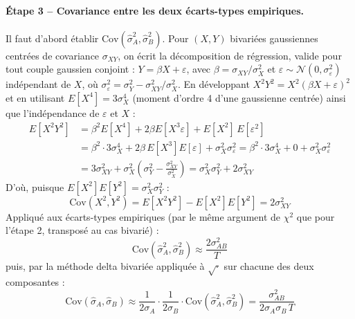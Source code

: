 \documentclass{article}
\begin{document}
\paragraph{Étape 3 -- Covariance entre les deux écarts-types empiriques.} Il faut d'abord établir $\text{Cov}(\hat\sigma_A^2,\hat\sigma_B^2)$. Pour $(X,Y)$ bivariées gaussiennes centrées de covariance $\sigma_{XY}$, on écrit la décomposition de régression, valide pour tout couple gaussien conjoint : $Y=\beta X+\varepsilon$, avec $\beta=\sigma_{XY}/\sigma_X^2$ et $\varepsilon\sim\mathcal{N}(0,\sigma_\varepsilon^2)$ indépendant de $X$, où $\sigma_\varepsilon^2=\sigma_Y^2-\sigma_{XY}^2/\sigma_X^2$. En développant $X^2Y^2=X^2(\beta X+\varepsilon)^2$ et en utilisant $E[X^4]=3\sigma_X^4$ (moment d'ordre 4 d'une gaussienne centrée) ainsi que l'indépendance de $\varepsilon$ et $X$ :
\begin{align}
E[X^2Y^2] &= \beta^2 E[X^4] + 2\beta E[X^3\varepsilon] + E[X^2]\,E[\varepsilon^2] \\
&= \beta^2\cdot 3\sigma_X^4 + 2\beta\,E[X^3]E[\varepsilon] + \sigma_X^2\sigma_\varepsilon^2 = \beta^2\cdot 3\sigma_X^4 + 0 + \sigma_X^2\sigma_\varepsilon^2\\
&= 3\sigma_{XY}^2 + \sigma_X^2\left(\sigma_Y^2-\frac{\sigma_{XY}^2}{\sigma_X^2}\right) = \sigma_X^2\sigma_Y^2 + 2\sigma_{XY}^2
\end{align}
D'où, puisque $E[X^2]E[Y^2]=\sigma_X^2\sigma_Y^2$ :
\begin{equation}
\text{Cov}(X^2,Y^2) = E[X^2Y^2]-E[X^2]E[Y^2] = 2\sigma_{XY}^2
\end{equation}
Appliqué aux écarts-types empiriques (par le même argument de $\chi^2$ que pour l'étape 2, transposé au cas bivarié) :
\begin{equation}
\text{Cov}(\hat\sigma_A^2,\hat\sigma_B^2) \approx \frac{2\sigma_{AB}^2}{T}
\end{equation}
puis, par la méthode delta bivariée appliquée à $\sqrt{\cdot}$ sur chacune des deux composantes :
\begin{equation}
\text{Cov}(\hat\sigma_A,\hat\sigma_B) \approx \frac{1}{2\sigma_A}\cdot\frac{1}{2\sigma_B}\cdot\text{Cov}(\hat\sigma_A^2,\hat\sigma_B^2) = \frac{\sigma_{AB}^2}{2\sigma_A\sigma_B\, T}
\end{equation}
\end{document}

